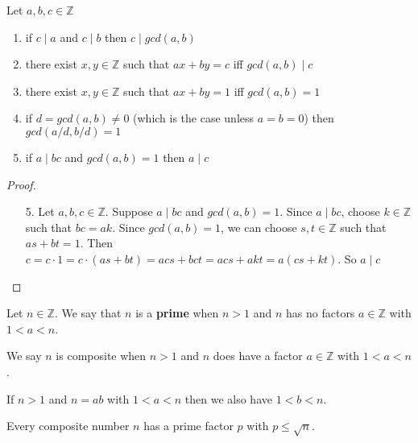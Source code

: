 
\begin{thm}
Let $a,b,c\in\mathbb{Z}$
\begin{enumerate}
\item if $c\mid a $ and $c\mid b$ then $c\mid gcd(a,b)$
\item there exist $x,y\in\mathbb{Z}$ such that $ax+by = c$ iff $gcd(a,b)\mid c$
\item there exist $x,y\in\mathbb{Z}$ such that $ax+by = 1$ iff $gcd(a,b) = 1$
\item if $d = gcd(a,b) \neq 0$ (which is the case unless $a=b=0$) then $gcd(a/d,b/d) = 1$
\item if $a\mid bc$ and $gcd(a,b) = 1$ then $a\mid c$
\end{enumerate}
\end{thm}

\begin{proof}
\begin{enumerate}
\item[5.] Let $a,b,c\in\mathbb{Z}$. Suppose $a\mid bc$ and $gcd(a,b) = 1$. Since $a\mid bc$, choose $k\in\mathbb{Z}$ such that $bc = ak$. Since $gcd(a,b) = 1$, we can choose $s,t\in\mathbb{Z}$ such that $as+bt = 1$. Then $c=c\cdot 1 = c\cdot (as+bt) = acs + bct = acs + akt = a(cs + kt)$. So $a\mid c$
\end{enumerate}
\end{proof}

\begin{defn}[Prime]
Let $n\in\mathbb{Z}$. We say that $n$ is a \textbf{prime} when $n>1$ and $n$ has no factors $a\in\mathbb{Z}$ with $1<a<n$.

We say $n$ is composite when $n>1$ and $n$ does have a factor $a\in\mathbb{Z}$ with $1<a<n$.
\end{defn}

\begin{note}
If $n>1$ and $n=ab$ with $1<a<n$ then we also have $1<b<n$.
\end{note}

\begin{thm}
Every composite number $n$ has a prime factor $p$ with $p\leq \sqrt{n}$.
\end{thm}

